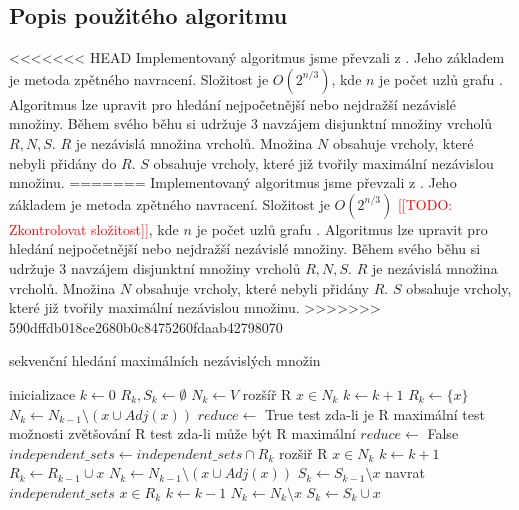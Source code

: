 \documentclass[12pt]{article}
\newcommand{\todo}[1]{\textcolor{red}{[[TODO: #1]]}}
\begin{document}
\subsection{Popis použitého algoritmu}
<<<<<<< HEAD
Implementovaný algoritmus jsme převzali z \cite{demel}. Jeho základem je metoda zpětného navracení. Složitost je \(O(2^{n/3})\), kde \(n\) je počet uzlů grafu \cite{tarjan}. Algoritmus lze upravit pro hledání nejpočetnější nebo nejdražší nezávislé množiny. Během svého běhu si udržuje 3 navzájem disjunktní množiny vrcholů \(R, N, S\). \(R\) je nezávislá množina vrcholů. Množina \(N\) obsahuje vrcholy, které nebyli přidány do \(R\). \(S\) obsahuje vrcholy, které již tvořily maximální nezávislou množinu.
=======
Implementovaný algoritmus jsme převzali z \cite{demel}. Jeho základem je metoda zpětného navracení. Složitost je \(O(2^{n/3})\) \todo{Zkontrolovat složitost}, kde \(n\) je počet uzlů grafu \cite{tarjan}. Algoritmus lze upravit pro hledání nejpočetnější nebo nejdražší nezávislé množiny. Během svého běhu si udržuje 3 navzájem disjunktní množiny vrcholů \(R, N, S\). \(R\) je nezávislá množina vrcholů. Množina \(N\) obsahuje vrcholy, které nebyli přidány \(R\). \(S\) obsahuje vrcholy, které již tvořily maximální nezávislou množinu.
>>>>>>> 590dffdb018ce2680b0c8475260fdaab42798070

\begin{algorithm}[H]
\caption{sekvenční hledání maximálních nezávislých množin}
\begin{algorithmic}
\State \Comment inicializace
\State $k \leftarrow 0$
\State $R_k, S_k \leftarrow \emptyset$
\State $N_k \leftarrow V$
\State \Comment rozšíř R
\State $x \in N_k$
\State $k \leftarrow k+1$
\State $R_k \leftarrow \{x\}$
\State $N_k \leftarrow N_{k-1} \setminus ({x} \cup Adj(x))$
  \State $reduce \leftarrow$ True
  \State \Comment test zda-li je R maximální                           
    \State \Comment test možnosti zvětšování R
      \State \Comment test zda-li může být R maximální
        \State $reduce \leftarrow$ False
      \EndIf    
    \EndIf
  \Else
    \State $independent\_sets \leftarrow independent\_sets \cap {R_k}$
  \EndIf  
    \State \Comment rozšiř R
    \State $x \in N_k$
    \State $k \leftarrow k+1$
    \State $R_k \leftarrow R_{k-1} \cup {x}$    
    \State $N_k \leftarrow N_{k-1} \setminus ({x} \cup Adj(x))$
    \State $S_k \leftarrow S_{k-1} \setminus {x}$
  \Else
    \State \Comment navrat
      \State \Return $independent\_sets$
    \EndIf
    \State $x \in R_k$
    \State $k \leftarrow k - 1$
    \State $N_k \leftarrow N_k \setminus {x}$
    \State $S_k \leftarrow S_k \cup {x}$
  \EndIf
\EndWhile
\EndFunction
\end{algorithmic}
\end{algorithm}
\end{document}

